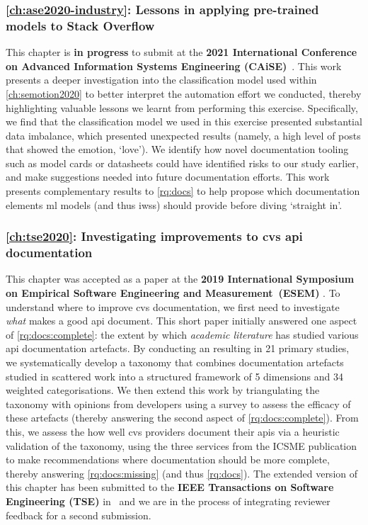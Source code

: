 \subsubsection{\cref{ch:ase2020-industry}: Lessons in applying pre-trained models to Stack Overflow} This chapter is \textbf{in progress} to submit at the \textbf{2021 International Conference on Advanced Information Systems Engineering (CAiSE)}~\citep{Graetsch:2020ase-industry}. This work presents a deeper investigation into the classification model used within \cref{ch:semotion2020} to better interpret the automation effort we conducted, thereby highlighting valuable lessons we learnt from performing this exercise. Specifically, we find that the classification model we used in this exercise presented substantial data imbalance, which presented unexpected results (namely, a high level of posts that showed the emotion, `love'). We identify how novel documentation tooling such as model cards \citep{Mitchell:2018in} or datasheets \citep{Gebru:2018wh} could have identified risks to our study earlier, and make suggestions needed into future documentation efforts. This work presents complementary  results to \cref{rq:docs} to help propose which documentation elements \gls{ml} models (and thus \glspl{iws}) should provide before diving `straight in'.

\subsubsection{\cref{ch:tse2020}: Investigating improvements to \gls{cvs} \gls{api} documentation} This chapter was accepted as a paper at the \textbf{2019 International Symposium on Empirical Software Engineering and Measurement~(ESEM)} \citep{Cummaudo:2020icse}. To understand where to improve \gls{cvs} documentation, we first need to investigate \textit{what} makes a good \gls{api} document. This short paper initially answered one aspect of \ref{rq:docs:complete}: the extent by which \textit{academic literature} has studied various \gls{api} documentation artefacts. By conducting an  resulting in 21 primary studies, we systematically develop a taxonomy that combines documentation artefacts studied in scattered work into a structured framework of 5 dimensions and 34 weighted categorisations. We then extend this work by triangulating the taxonomy with opinions from developers using a survey to assess the efficacy of these artefacts (thereby answering the second aspect of \ref{rq:docs:complete}). From this, we assess the how well \gls{cvs} providers document their \glspl{api} via a heuristic validation of the taxonomy, using the three services from the ICSME publication to make recommendations where documentation should be more complete, thereby answering \ref{rq:docs:missing} (and thus \ref{rq:docs}). The extended version of this chapter has been submitted to the \textbf{IEEE Transactions on Software Engineering (TSE)} in~\citep{Cummaudo:2020tse} and we are in the process of integrating reviewer feedback for a second submission.

